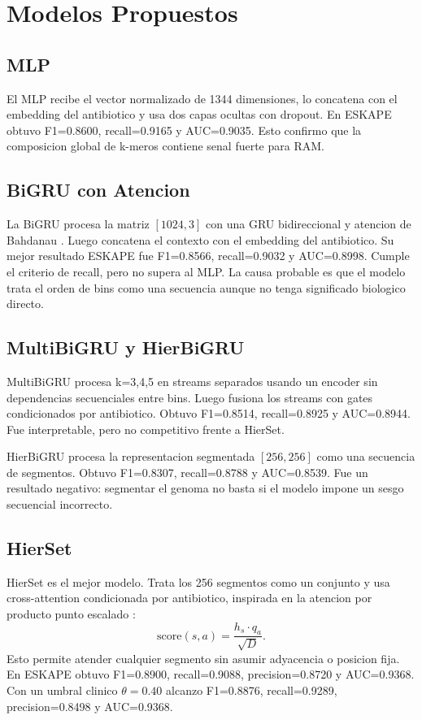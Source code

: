 \documentclass[journal,transmag]{../ieee_latex_template/IEEEtran}
\begin{document}
\section{Modelos Propuestos}
\subsection{MLP}
El MLP recibe el vector normalizado de 1344 dimensiones, lo concatena con el embedding del antibiotico y usa dos capas ocultas con dropout. En ESKAPE obtuvo F1=0.8600, recall=0.9165 y AUC=0.9035. Esto confirmo que la composicion global de k-meros contiene senal fuerte para RAM.

\subsection{BiGRU con Atencion}
La BiGRU procesa la matriz $[1024,3]$ con una GRU bidireccional y atencion de Bahdanau \cite{cho2014,schuster1997,bahdanau2015}. Luego concatena el contexto con el embedding del antibiotico. Su mejor resultado ESKAPE fue F1=0.8566, recall=0.9032 y AUC=0.8998. Cumple el criterio de recall, pero no supera al MLP. La causa probable es que el modelo trata el orden de bins como una secuencia aunque no tenga significado biologico directo.

\subsection{MultiBiGRU y HierBiGRU}
MultiBiGRU procesa k=3,4,5 en streams separados usando un encoder sin dependencias secuenciales entre bins. Luego fusiona los streams con gates condicionados por antibiotico. Obtuvo F1=0.8514, recall=0.8925 y AUC=0.8944. Fue interpretable, pero no competitivo frente a HierSet.

HierBiGRU procesa la representacion segmentada $[256,256]$ como una secuencia de segmentos. Obtuvo F1=0.8307, recall=0.8788 y AUC=0.8539. Fue un resultado negativo: segmentar el genoma no basta si el modelo impone un sesgo secuencial incorrecto.

\subsection{HierSet}
HierSet es el mejor modelo. Trata los 256 segmentos como un conjunto y usa cross-attention condicionada por antibiotico, inspirada en la atencion por producto punto escalado \cite{vaswani2017}:
\begin{equation}
\mathrm{score}(s,a) = \frac{h_s \cdot q_a}{\sqrt{D}} .
\end{equation}
Esto permite atender cualquier segmento sin asumir adyacencia o posicion fija. En ESKAPE obtuvo F1=0.8900, recall=0.9088, precision=0.8720 y AUC=0.9368. Con un umbral clinico $\theta=0.40$ alcanzo F1=0.8876, recall=0.9289, precision=0.8498 y AUC=0.9368.
\end{document}
